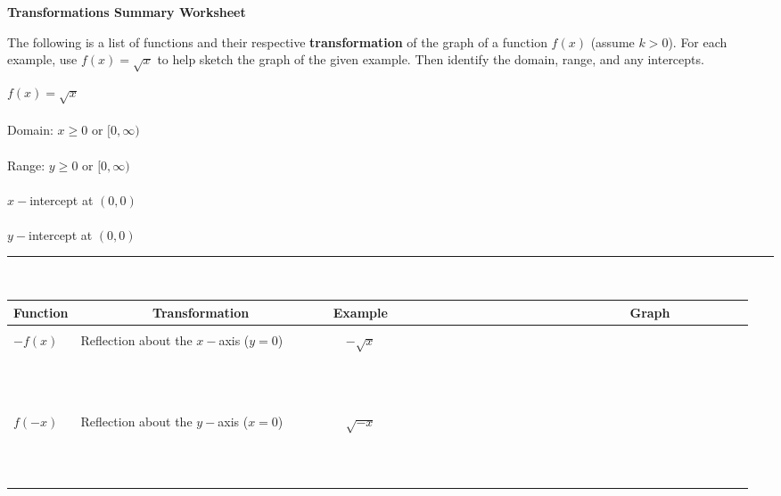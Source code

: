 \documentclass[12pt]{article}
\theoremstyle{definition}
\begin{document}
\begin{center}
{\bf Transformations Summary Worksheet}\label{les:translations}
\label{les:reflections}
\label{les:scalings}
\label{les:transformations_summary}

\end{center}

\noindent The following is a list of functions and their respective {\bf transformation} of the graph of a function $f(x)$ (assume $k>0$).  For each example, use $f(x)=\sqrt{x}$ to help sketch the graph of the given example.  Then identify the domain, range, and any intercepts.\\
\begin{multicols}{2}
$f(x)=\sqrt{x}$\\
~\\
Domain: $x\geq 0$ or $[0,\infty)$\\
~\\
Range: $y\geq 0$ or $[0,\infty)$\\
~\\
$x-$intercept at $(0,0)$\\
~\\
$y-$intercept at $(0,0)$\\

\end{multicols}
\hrule
~\\
\begin{tabular}{llll}
Function & ~~~~~~~~~~Transformation~~~~~~~~~~ & Example & ~~~~~~~~~~~~~~~~~~~~~~~~~~~~~~~~Graph~~~~~~~~~~\\
\hline
\\
$-f(x)$ & Reflection about the $x-$axis ($y=0$) & ~~$-\sqrt{x}$ &\\
\\
&&&\\
&&&\\
&&&\\
&&&\\
&&&\\
&&&\\
&&&\\
&&&\\
&&&\\
&&&\\
&&&\\
$f(-x)$ & Reflection about the $y-$axis ($x=0$) & ~~$\sqrt{-x}$ &\\
\\
&&&\\
&&&\\
&&&\\
&&&\\
&&&\\
&&&\\
&&&\\
&&&\\
&&&\\
&&&\\
\end{tabular}
\end{document}

